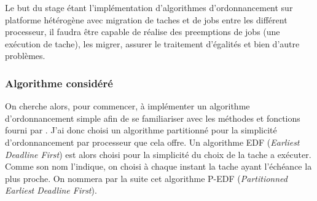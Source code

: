 Le but du stage étant l'implémentation d'algorithmes d'ordonnancement sur platforme hétérogène avec migration de taches et de jobs entre les différent \gls{processeur}, il faudra être capable de réalise des \glspl{preemption} de jobs (une exécution de tache), les migrer, assurer le traitement d'égalités et bien d'autre problèmes.


\subsubsection{Algorithme considéré}

On cherche alors, pour commencer, à implémenter un algorithme d’ordonnancement simple afin de se familiariser avec les méthodes et fonctions fourni par \litmus. J'ai donc choisi un algorithme partitionné pour la simplicité d’ordonnancement par \gls{processeur} que cela offre. Un algorithme EDF (\textit{Earliest Deadline First}) est alors choisi pour la simplicité du choix de la tache a exécuter. Comme son nom l'indique, on choisi à chaque instant la tache ayant l'échéance la plus proche. On nommera par la suite cet algorithme P-EDF (\textit{Partitionned Earliest Deadline First}).

